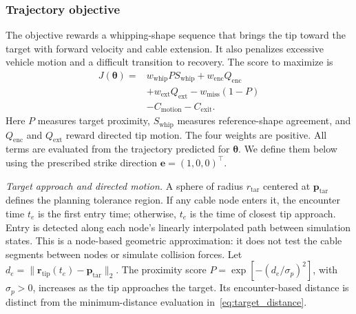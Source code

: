 \documentclass[letterpaper, 10 pt, conference]{ieeeconf}
\begin{document}
\subsubsection{Trajectory objective}
The objective rewards a whipping-shape sequence that brings the
tip toward the target with forward velocity and cable extension.
It also penalizes excessive vehicle motion and a difficult
transition to recovery. The score to maximize is
\begin{equation}
\begin{aligned}
J(\boldsymbol\theta)
={}&w_{\mathrm{whip}}P S_{\mathrm{whip}}
   +w_{\mathrm{enc}}Q_{\mathrm{enc}}\\
&+w_{\mathrm{ext}}Q_{\mathrm{ext}}
   -w_{\mathrm{miss}}(1-P)\\
&-C_{\mathrm{motion}}-C_{\mathrm{exit}}.
\end{aligned}
\label{eq:planning_score}
\end{equation}
Here $P$ measures target proximity, $S_{\mathrm{whip}}$ measures
reference-shape agreement, and $Q_{\mathrm{enc}}$ and
$Q_{\mathrm{ext}}$ reward directed tip motion. The four weights
are positive. All terms are evaluated from the trajectory predicted
for $\boldsymbol\theta$. We define them below using the prescribed
strike direction $\mathbf e=(1,0,0)^\top$.

\noindent\emph{Target approach and directed motion.}
A sphere of radius $r_{\mathrm{tar}}$ centered at
$\mathbf p_{\mathrm{tar}}$ defines the planning tolerance region.
If any cable node enters it, the encounter time $t_e$ is the
first entry time; otherwise, $t_e$ is the time of closest tip
approach. Entry is detected along each node's linearly interpolated
path between simulation states. This is a node-based geometric
approximation: it does not test the cable segments between nodes
or simulate collision forces. Let
$d_e=\|\mathbf r_{\mathrm{tip}}(t_e)-\mathbf p_{\mathrm{tar}}\|_2$.
The proximity score $P=\exp[-(d_e/\sigma_p)^2]$, with
$\sigma_p>0$, increases as the tip approaches the target.
Its encounter-based distance is distinct from the minimum-distance
evaluation in~\eqref{eq:target_distance}.
\end{document}
